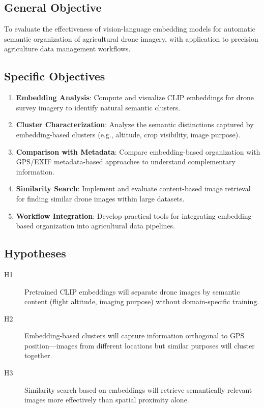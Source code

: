 
\subsection{General Objective}

To evaluate the effectiveness of vision-language embedding models for automatic semantic organization of agricultural drone imagery, with application to precision agriculture data management workflows.

\subsection{Specific Objectives}

\begin{enumerate}
    \item \textbf{Embedding Analysis}: Compute and visualize CLIP embeddings for drone survey imagery to identify natural semantic clusters.

    \item \textbf{Cluster Characterization}: Analyze the semantic distinctions captured by embedding-based clusters (e.g., altitude, crop visibility, image purpose).

    \item \textbf{Comparison with Metadata}: Compare embedding-based organization with GPS/EXIF metadata-based approaches to understand complementary information.

    \item \textbf{Similarity Search}: Implement and evaluate content-based image retrieval for finding similar drone images within large datasets.

    \item \textbf{Workflow Integration}: Develop practical tools for integrating embedding-based organization into agricultural data pipelines.
\end{enumerate}

\subsection{Hypotheses}

\begin{description}
    \item[H1] Pretrained CLIP embeddings will separate drone images by semantic content (flight altitude, imaging purpose) without domain-specific training.

    \item[H2] Embedding-based clusters will capture information orthogonal to GPS position---images from different locations but similar purposes will cluster together.

    \item[H3] Similarity search based on embeddings will retrieve semantically relevant images more effectively than spatial proximity alone.
\end{description}

